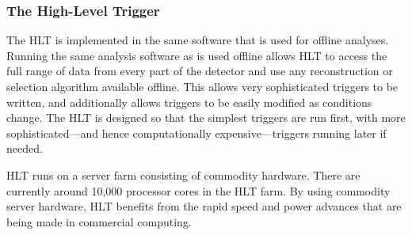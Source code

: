 \subsubsection{The High-Level Trigger}

The HLT is implemented in the same software that is used for offline analyses.
Running the same analysis software as is used offline allows HLT to access the
full range of data from every part of the detector and use any reconstruction
or selection algorithm available offline. This allows very sophisticated
triggers to be written, and additionally allows triggers to be easily modified
as conditions change. The HLT is designed so that the simplest triggers are run
first, with more sophisticated---and hence computationally expensive---triggers
running later if needed.

HLT runs on a server farm consisting of commodity hardware. There are currently
around 10,000 processor cores in the HLT farm. By using commodity server
hardware, HLT benefits from the rapid speed and power advances that are being
made in commercial computing.

